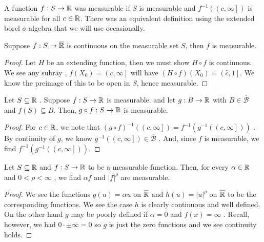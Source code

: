 \begin{recall}
	A function \(f: S \to \mathbb{R}\) was measurable if \(S\) is measurable and \(f^{-1}\left( \left( c, \infty \right]  \right) \) is measurable for all \(c \in \mathbb{R}\). There was an equivalent definition using the extended borel \(\sigma\)-algebra that we will use occasionally.
\end{recall}
\begin{proposition}
	Suppose \(f: S \to \overline{\mathbb{R}}\) is continuous on the measurable set \(S\), then \(f\) is measurable.
\end{proposition}
\begin{proof}
	Let \(H\) be an extending function, then we must show \(H \circ f\) is continuous. We see any subray , \(f\left( X_0 \right) = \left( c , \infty \right] \) will have \((H \circ f)\left( X_0 \right) = \left( \hat{c}, 1 \right] \). We know the preimage of this to be open in \(S\), hence measurable.
\end{proof}
\begin{proposition}
	Let \(S \subseteq \mathbb{R}\)	. Suppose \(f: S \to \mathbb{R}\) is measurable. and let \(g: B \to \mathbb{R}\) with \(B \in \overline{\mathscr{B}}\)  and \(f\left( S \right) \subseteq B\). Then, \(g \circ f: S \to \mathbb{R}\) is measurable.
\end{proposition}
\begin{proof}
	For \(c \in \mathbb{R}\), we note that \(\left( g \circ f \right) ^{-1} \left( \left( c, \infty \right]  \right)  = f^{-1}\left( g^{-1}\left( \left( c, \infty \right]  \right)  \right) \) . By continuity of \(g\), we know \(g^{-1}\left( \left( c, \infty \right]  \right) \in \overline{\mathscr{B}}\) . And, since \(f\) is measurable, we find \(f^{-1}\left( g^{-1}\left( \left( c, \infty \right]  \right)  \right) \).
\end{proof}
\begin{corollary}[]
Let \(S \subseteq \mathbb{R}\)	 and \(f: S \to \mathbb{R}\)	to be a measurable function. Then, for every \(\alpha \in \mathbb{R}\)	and \(0 < \rho < \infty\)	, we find \(\alpha f\)	 and \(\left| f \right| ^{\rho}\)	 are measurable.
\end{corollary}
\begin{proof}
	We see the functions \(g\left( u \right) = \alpha u\)	on \(\overline{\mathbb{R}}\)	and \(h\left( u \right)  = \left| u \right| ^{\rho}\)	 on \(\overline{\mathbb{R}}\)	 to be the corresponding functions. We see the case \(h\)	is clearly continuous and well defined. On the other hand \(g\)	may be poorly defined if \(\alpha = 0\)	 and \(f\left( x \right)  = \infty\)	. Recall, however, we had \(0 \cdot  \pm \infty = 0\)	so \(g\)	 is just the zero functions and we see continuity holds.
\end{proof}
